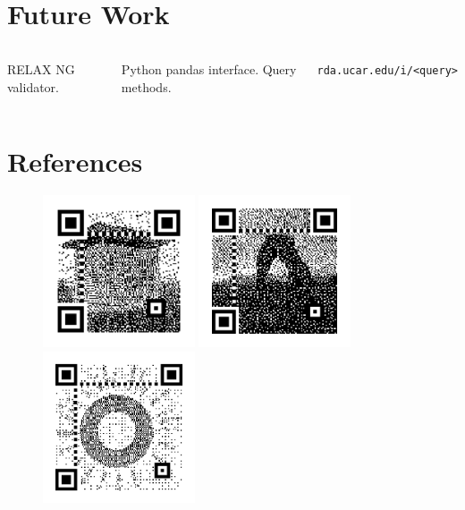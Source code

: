 \documentclass{beamer}
\begin{document}
\section{Future Work}

\begin{frame}
	\begin{columns}
        RELAX NG validator.

        Python pandas interface.
        Query methods.

        \texttt{rda.ucar.edu/i/<query>}
	\end{columns}
\end{frame}

\section{References}
\begin{frame}
    \begin{figure}
        \includegraphics[width=0.4\textwidth]{img/meteo_qrcode}
        \includegraphics[width=0.4\textwidth]{img/arch_qrcode}
        \includegraphics[width=0.4\textwidth]{img/brohan_qrcode}
    \end{figure}
\end{frame}
\end{document}
